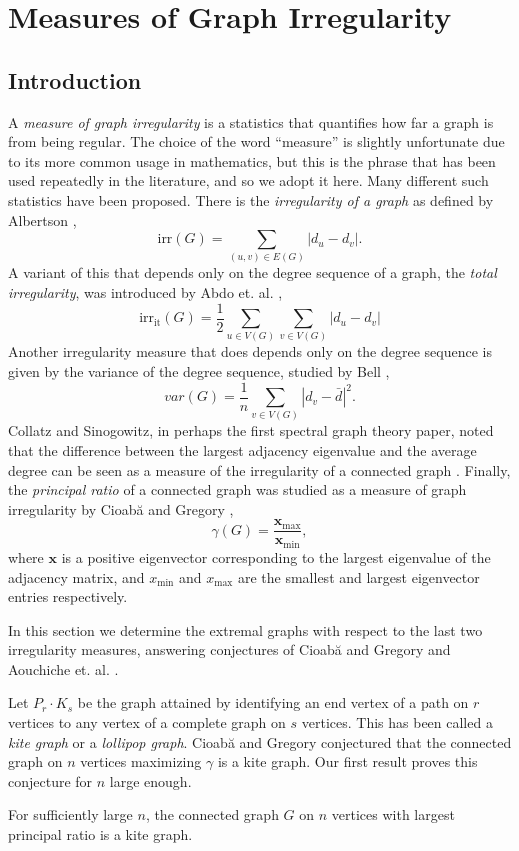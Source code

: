 \chapter{Measures of Graph Irregularity}
\section{Introduction}

A \textit{measure of graph irregularity} is a  statistics that quantifies how far a graph is
from being regular.  The choice of the word ``measure'' is slightly unfortunate due to its
more common usage in mathematics, but this is the phrase that has been used repeatedly in the
literature, and so we adopt it here.  Many different such statistics have been proposed.
There is the \textit{irregularity of a graph} as defined by Albertson \cite{Albertson1997},
\[ \textrm{irr}(G) = \sum_{(u,v) \in E(G)} \left| d_u - d_v \right| .\]
A variant of this that depends only on the degree sequence of a graph,
the \textit{total irregularity}, was introduced by Abdo et. al. \cite{Abdo2014},
\[ \textrm{irr}_{\textrm{it}}(G) = \frac{1}{2} \sum_{u \in V(G)} \sum_{v \in V(G)} \left| d_u - d_v\right|\]
Another irregularity measure that does depends only on the degree sequence is given by the
variance of the degree sequence, studied by Bell \cite{Bell1992},
\[var(G) = \frac{1}{n} \sum_{v\in V(G)} \left| d_v - \bar{d} \right|^2 . \]
Collatz and Sinogowitz, in perhaps the first spectral graph theory paper, noted
that the difference between the largest adjacency eigenvalue and the average degree
can be seen as a measure of the irregularity of a connected graph \cite{CollatzSinogowitz1957}.
Finally, the \textit{principal ratio} of a connected graph was studied as a
measure of graph irregularity by Cioab\u{a} and Gregory \cite{CioabaGregory2007},
\[ \gamma(G) = \frac{\mathbf{x}_{\text{max}}}{\mathbf{x}_{\text{min}}},\]
where $\mathbf{x}$ is a positive eigenvector corresponding to the
largest eigenvalue of the adjacency matrix, and
$x_{\text{min}}$ and $x_{\text{max}}$ are the smallest and largest eigenvector
entries respectively.

In this section we determine the extremal graphs
with respect to the last two irregularity measures,
answering conjectures of Cioab\u{a} and Gregory \cite{CioabaGregory2007}
and Aouchiche et. al. \cite{AouchicheEtAl2008}.


Let $P_r \cdot K_s$ be the graph attained by identifying an end vertex
of a path on $r$ vertices to any vertex of a complete graph
on $s$ vertices.  This has been called a \textit{kite graph} or a
\textit{lollipop graph}.  Cioab\u{a} and Gregory \cite{CioabaGregory2007}
conjectured that the connected graph on $n$ vertices maximizing $\gamma$
is a kite graph.  Our first result proves this conjecture for $n$ large
enough.
\begin{theorem}\label{main_theorem}
  For sufficiently large $n$, the connected graph $G$ on $n$
  vertices with largest principal ratio is a kite graph.
\end{theorem}


